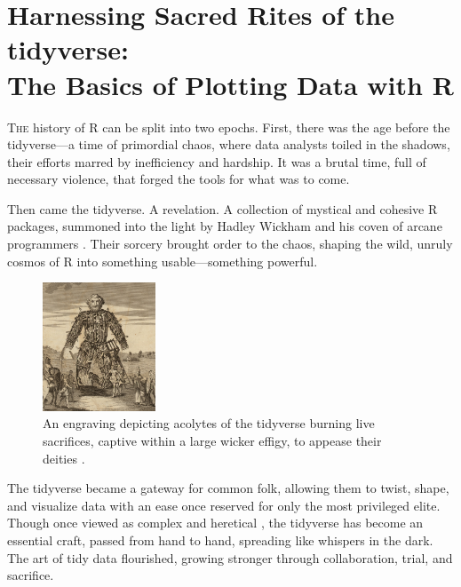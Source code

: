 \chapter[Harnessing Sacred Rites of the tidyverse: Plotting Basics]{Harnessing Sacred Rites of the tidyverse:\\ \huge The Basics of Plotting Data with R}

\lettrine{T}{he} history of R can be split into two epochs. First, there was the age before the tidyverse—a time of primordial chaos, where data analysts toiled in the shadows, their efforts marred by inefficiency and hardship. It was a brutal time, full of necessary violence, that forged the tools for what was to come.

Then came the tidyverse. A revelation. A collection of mystical and cohesive R packages, summoned into the light by Hadley Wickham and his coven of arcane programmers \parencite{Wickham2019}. Their sorcery brought order to the chaos, shaping the wild, unruly cosmos of R into something usable—something powerful.

\begin{figure}
  \begin{center}
    \includegraphics[width=0.3\textwidth]{graphics/ch2Figs/t_pennant.pdf}
  \end{center}
    \caption{An engraving depicting acolytes of the tidyverse burning live sacrifices, captive within a large wicker effigy, to appease their deities \parencite{Pennant1784}.}
    \label{fig:ch2_wicker}
\end{figure}

The tidyverse became a gateway for common folk, allowing them to twist, shape, and visualize data with an ease once reserved for only the most privileged elite. Though once viewed as complex and heretical \parencite{Muenchen}, the tidyverse has become an essential craft, passed from hand to hand, spreading like whispers in the dark. The art of tidy data flourished, growing stronger through collaboration, trial, and sacrifice.

